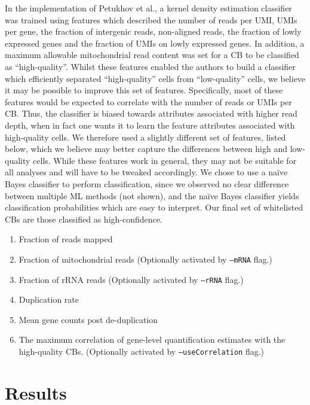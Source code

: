 In the implementation of Petukhov et al.\citep{dropest}, a kernel density estimation classifier was trained using features which described the number of reads per UMI, UMIs per gene, the fraction of intergenic reads, non-aligned reads, the fraction of lowly expressed genes and the fraction of UMIs on lowly expressed genes. In addition, a maximum allowable mitochondrial read content was set for a CB to be classified as ``high-quality''. Whilst these features enabled the authors to build a classifier which efficiently separated ``high-quality'' cells from ``low-quality'' cells, we believe it may be possible to improve this set of features. Specifically, most of these features would be expected to correlate with the number of reads or UMIs per CB. Thus, the classifier is biased towards attributes  associated with higher read depth, when in fact one wants it to learn the feature attributes associated with high-quality cells. We therefore used a slightly different set of features, listed below, which we believe may better capture the differences between high and low-quality cells. While these features work in general, they may not be suitable for all analyses and will have to be tweaked accordingly. We chose to use a na\"ive Bayes classifier to perform classification, since we observed no clear difference between multiple ML methods (not shown), and the na\"ive Bayes classifier yields classification probabilities which are easy to interpret. Our final set of whitelisted CBs are those classified as high-confidence.

\begin{enumerate}  
\item Fraction of reads mapped
\item Fraction of mitochondrial reads (Optionally activated by \texttt{{--}mRNA} flag.)
\item Fraction of rRNA reads (Optionally activated by \texttt{{--}rRNA} flag.)
\item Duplication rate
\item Mean gene counts post de-duplication
\item The maximum correlation of gene-level quantification estimates with the high-quality CBs. (Optionally activated by \texttt{{--}useCorrelation} flag.)
\end{enumerate}


\section{Results}

